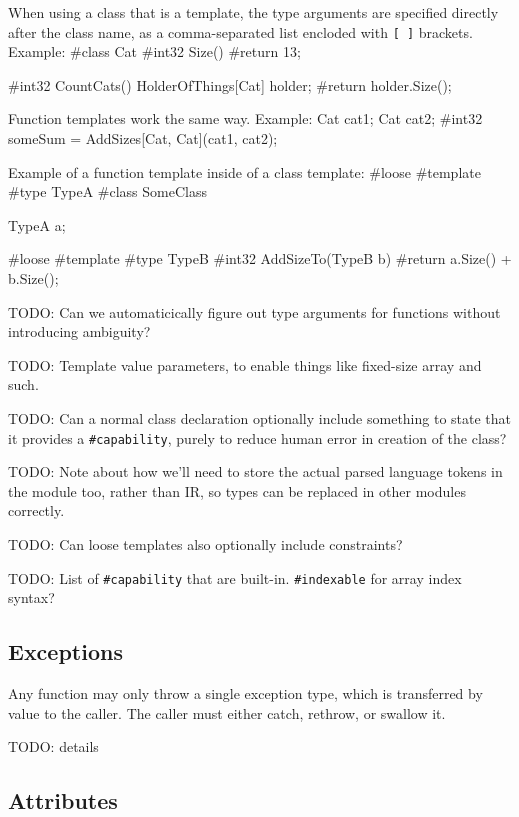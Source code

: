 \documentclass{article}
\newcommand{\code}[1]{\colorbox{light-gray}{\texttt{#1}}}
\newenvironment{codebox} {\snugshade\verbatim} {\endverbatim\endsnugshade}
\begin{document}
When using a class that is a template, the type arguments are specified directly after the class name, as a comma-separated list encloded with \code{[ ]} brackets.  Example:
\begin{codebox}
#class Cat
{
    #int32 Size()
    {
        #return 13;
    }
}

#int32 CountCats()
{
    HolderOfThings[Cat] holder;
    #return holder.Size();
}
\end{codebox}

Function templates work the same way.  Example:
\begin{codebox}
Cat cat1;
Cat cat2;
#int32 someSum = AddSizes[Cat, Cat](cat1, cat2);
\end{codebox}

Example of a function template inside of a class template:
\begin{codebox}
#loose #template
#type TypeA
#class SomeClass
{
    TypeA a;

    #loose #template
    #type TypeB
    #int32 AddSizeTo(TypeB b)
    {
        #return a.Size() + b.Size();
    }
}
\end{codebox}

TODO: Can we automaticically figure out type arguments for functions without introducing ambiguity?

TODO: Template value parameters, to enable things like fixed-size array and such.

TODO: Can a normal class declaration optionally include something to state that it provides a \code{\#capability}, purely to reduce human error in creation of the class?

TODO: Note about how we'll need to store the actual parsed language tokens in the module too, rather than IR, so types can be replaced in other modules correctly.

TODO: Can loose templates also optionally include constraints?

TODO: List of \code{\#capability} that are built-in.  \code{\#indexable} for array index syntax?

\subsection{Exceptions}
Any function may only throw a single exception type, which is transferred by value to the caller.  The caller must either catch, rethrow, or swallow it.

TODO: details

\subsection{Attributes}
\end{document}
